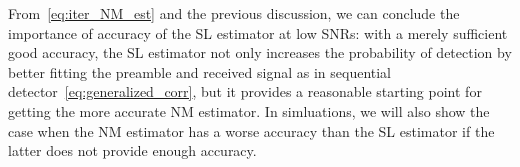 From~\eqref{eq:iter_NM_est} and the previous discussion, we can conclude the importance of accuracy of the SL estimator
at low SNRs: 
with a merely sufficient good accuracy, the SL estimator not only increases the probability of detection by better
fitting the preamble and received signal as in sequential detector~\eqref{eq:generalized_corr}, but 
it provides a reasonable starting point for getting the more accurate NM estimator. In simluations,
we will also show the case when the NM estimator has a worse accuracy than the SL estimator if the latter does not provide enough accuracy. 

